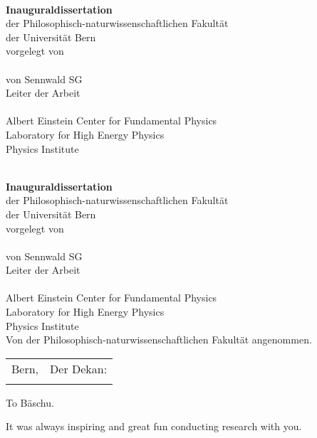 \begin{titlepage}
	\begin{center}
		\null
		\vfill
		\textbf{\LARGE\Title}\\[20mm]
		\textbf{\large Inauguraldissertation}\\
		{\large der Philosophisch-naturwissenschaftlichen Fakultät}\\
		{\large der Universität Bern}\\[20mm]
		{\large vorgelegt von}\\[10mm]
		\textbf{\Large\Author}\\[10mm]
		{\large von Sennwald SG}\\[20mm]
		{\large Leiter der Arbeit}\\
		\textbf{\large\Supervisor}\\[10mm]
		{\large Albert Einstein Center for Fundamental Physics}\\
		{\large Laboratory for High Energy Physics}\\
		{\large Physics Institute}\\
		\vfill
	\end{center}
\end{titlepage}
\cleardoublepage
\begin{titlepage}
	\begin{center}
		\null
		\vfill
		\textbf{\LARGE\Title}\\[20mm]
		\textbf{\large Inauguraldissertation}\\
		{\large der Philosophisch-naturwissenschaftlichen Fakultät}\\
		{\large der Universität Bern}\\[20mm]
		{\large vorgelegt von}\\[10mm]
		\textbf{\Large\Author}\\[10mm]
		{\large von Sennwald SG}\\[20mm]
		{\large Leiter der Arbeit}\\
		\textbf{\large\Supervisor}\\[10mm]
		{\large Albert Einstein Center for Fundamental Physics}\\
		{\large Laboratory for High Energy Physics}\\
		{\large Physics Institute}\\[10mm]
		{\large Von der Philosophisch-naturwissenschaftlichen Fakultät angenommen.}\\[10mm]
		\begin{tabu} to 
			{\large Bern, \Date} &	{\large Der Dekan:} \\
			&						{\large\Dean}
		\end{tabu}
		\vfill
	\end{center}
\end{titlepage}
\cleardoublepage
\thispagestyle{empty}
To Bäschu.

\bigskip

It was always inspiring and great fun conducting research with you.
\cleardoublepage